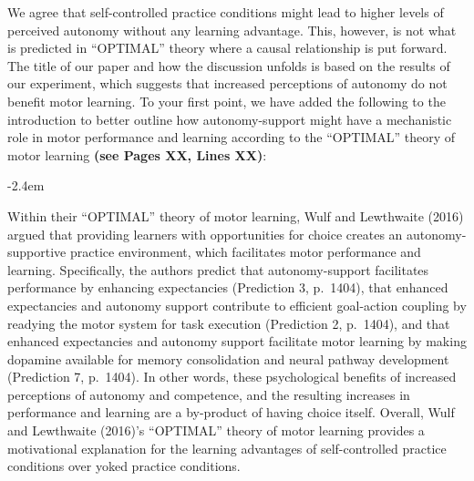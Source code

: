 \documentclass[final]{article}
\renewenvironment{quote}{\begin{fquote}\advance\leftmargini -2.4em\begin{oldquote}}{\end{oldquote}\end{fquote}}
\newenvironment{fquote}
  {\def\FrameCommand{
	\fboxsep=0.6em %
	\fcolorbox{black}{white}}%
    \MakeFramed {\advance\hsize-2\width \FrameRestore}
    \begin{minipage}{\linewidth}
  }
  {\end{minipage}\endMakeFramed}
\begin{document}
We agree that self-controlled practice conditions might lead to higher levels of perceived autonomy without any learning advantage. This, however, is not what is predicted in ``OPTIMAL'' theory where a causal relationship is put forward. The title of our paper and how the discussion unfolds is based on the results of our experiment, which suggests that increased perceptions of autonomy do not benefit motor learning. To your first point, we have added the following to the introduction to better outline how autonomy-support might have a mechanistic role in motor performance and learning according to the ``OPTIMAL'' theory of motor learning \textbf{(see Pages XX, Lines XX)}:

\begin{quote}
Within their ``OPTIMAL'' theory of motor learning, Wulf and Lewthwaite (2016) argued that providing learners with opportunities for choice creates an autonomy-supportive practice environment, which facilitates motor performance and learning. Specifically, the authors predict that autonomy-support facilitates performance by enhancing expectancies (Prediction 3, p.~1404), that enhanced expectancies and autonomy support contribute to efficient goal-action coupling by readying the motor system for task execution (Prediction 2, p.~1404), and that enhanced expectancies and autonomy support facilitate motor learning by making dopamine available for memory consolidation and neural pathway development (Prediction 7, p.~1404). In other words, these psychological benefits of increased perceptions of autonomy and competence, and the resulting increases in performance and learning are a by-product of having choice itself. Overall, Wulf and Lewthwaite (2016)'s ``OPTIMAL'' theory of motor learning provides a motivational explanation for the learning advantages of self-controlled practice conditions over yoked practice conditions.
\end{quote}
\end{document}
